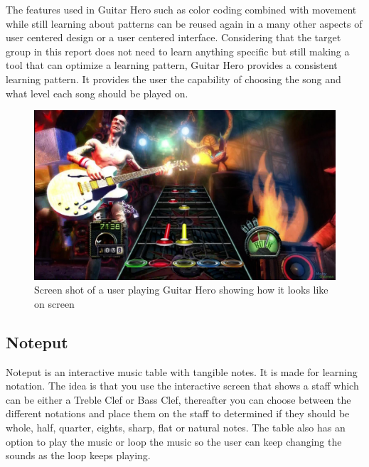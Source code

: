The features used in Guitar Hero such as color coding combined with movement while still learning about patterns can be reused again in a many other aspects of user centered design or a user centered interface. Considering that the target group in this report does not need to learn anything specific but still making a tool that can optimize a learning pattern, Guitar Hero provides a consistent learning pattern. It provides the user the capability of choosing the song and what level each song should be played on.
 
\begin{figure}[H]
	\centering
	\includegraphics[width=0.7\linewidth]{figure/Analysis/guitarhero}
	\caption{Screen shot of a user playing Guitar Hero showing how it looks like on screen}
	\label{fig:guitarHero}
\end{figure}



\subsection{Noteput} 
Noteput is an interactive music table with tangible notes. It is made for learning notation. The idea is that you use the interactive screen that shows a staff which can be either a Treble Clef or Bass Clef, thereafter you can choose between the different notations and place them on the staff to determined if they should be whole, half, quarter, eights, sharp, flat or natural notes. The table also has an option to play the music or loop the music so the user can keep changing the sounds as the loop keeps playing. 


